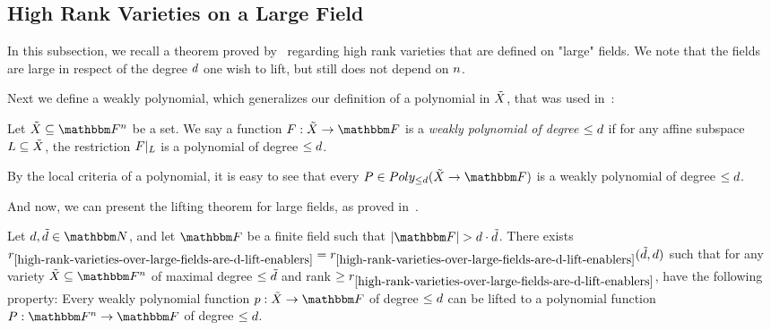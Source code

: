 \subsection[High Rank Varieties on a Large Field]{High Rank Varieties on a Large Field}\label{subsec:high-rank-varieties-on-a-large-field}
In this subsection, we recall a theorem proved by~\cite[Theorem 1.7]{kazhdan2019extendingweaklypolynomialfunctions} regarding high rank varieties that are defined on "large" fields.
We note that the fields are large in respect of the degree $d$ one wish to lift, but still does not depend on $n$.

Next we define a weakly polynomial, which generalizes our definition of a polynomial in ${\tilde{X}}$, that was used in~\cite[Definition 1.1]{kazhdan2019extendingweaklypolynomialfunctions}:
\begin{definition}
    Let $\variety \subseteq \field$ be a set.
    We say a function $\funcdef{\genfunc}{\variety}{\basefield}$ is a \emph{weakly polynomial of degree $\leq d$}
    if for any affine subspace $L \subseteq {\tilde{X}}$, the restriction $\restrictfunc{\genfunc}{L}$ is a polynomial of degree $\leq d$.
\end{definition}
\begin{remark}
    By the local criteria of a polynomial, it is easy to see that every $\genpoly \in \allpolyset{\leq \degree}{\variety}{\basefield}$ is a weakly polynomial of degree $\leq d$.
\end{remark}
And now, we can present the lifting theorem for large fields, as proved in~\cite[Theorem 2.17]{kazhdan2020propertieshighranksubvarieties}.
\begin{theorem}\label{high-rank-varieties-over-large-fields-are-d-lift-enablers}\cite[Theorem 2.17]{kazhdan2020propertieshighranksubvarieties}
    Let $\degree, \varietydeg \in \naturalnumbersset$,
    and let $\basefield$ be a finite field such that $\abs{\basefield} > \degree \cdot \varietydeg$.
    There exists ${{{r}}}_{\ref{high-rank-varieties-over-large-fields-are-d-lift-enablers}} = {{{r}}}_{\ref{high-rank-varieties-over-large-fields-are-d-lift-enablers}}(\tilde{d}, d)$
    such that for any variety $\variety \subseteq \field$ of maximal degree $\leq \tilde{d}$ and rank $\geq {{{r}}}_{\ref{high-rank-varieties-over-large-fields-are-d-lift-enablers}}$,
    have the following property:
    Every weakly polynomial function $\funcdef{\onvarpoly }{\variety}{\basefield}$ of degree $\leq d$
    can be lifted to a polynomial function $\funcdef{\genpoly}{\field}{\basefield}$ of degree $\leq d$.
\end{theorem}

